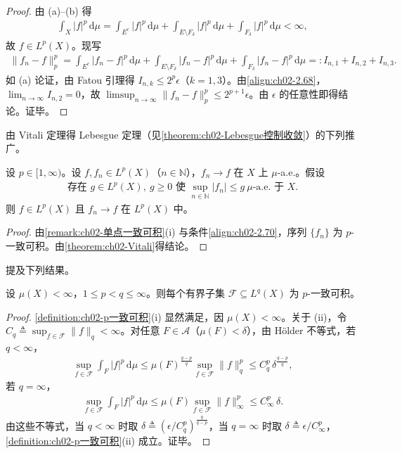 \documentclass[../../main.tex]{subfiles}%
\begin{document}
\begin{proof}
由 (a)--(b) 得
\begin{align*}
\int_X|f|^p\,\mathrm{d}\mu=\int_{E^c}|f|^p\,\mathrm{d}\mu+\int_{E\setminus F_\delta}|f|^p\,\mathrm{d}\mu+\int_{F_\delta}|f|^p\,\mathrm{d}\mu<\infty,
\end{align*}
故 $f\in L^p(X)$。现写
\begin{align}
\|f_n-f\|_p^p=\int_{E^c}|f_n-f|^p\,\mathrm{d}\mu+\int_{E\setminus F_\delta}|f_n-f|^p\,\mathrm{d}\mu+\int_{F_\delta}|f_n-f|^p\,\mathrm{d}\mu
=:I_{n,1}+I_{n,2}+I_{n,3}. \label{align:ch02-2.69}
\end{align}
如 (a) 论证，由 Fatou 引理得 $I_{n,k}\leqslant 2^p\epsilon$（$k=1,3$）。由\eqref{align:ch02-2.68}，$\lim_{n\to\infty}I_{n,2}=0$，故 $\limsup_{n\to\infty}\|f_n-f\|_p^p\leqslant 2^{p+1}\epsilon$。由 $\epsilon$ 的任意性即得结论。证毕。
\end{proof}

由 Vitali 定理得 Lebesgue 定理（见\cref{theorem:ch02-Lebesgue控制收敛}）的下列推广。

\begin{theorem}\label{theorem:ch02-Vitali推广}
设 $p\in[1,\infty)$。设 $f,f_n\in L^p(X)$（$n\in\mathbb N$），$f_n\to f$ 在 $X$ 上 $\mu$-a.e.。假设
\begin{align}
\text{存在 }g\in L^p(X),\ g\geqslant0\text{ 使 }\sup_{n\in\mathbb N}|f_n|\leqslant g\ \mu\text{-a.e. 于 }X. \label{align:ch02-2.70}
\end{align}
则 $f\in L^p(X)$ 且 $f_n\to f$ 在 $L^p(X)$ 中。
\end{theorem}

\begin{proof}
由\cref{remark:ch02-单点一致可积}(i) 与条件\eqref{align:ch02-2.70}，序列 $\{f_n\}$ 为 $p$-一致可积。由\cref{theorem:ch02-Vitali}得结论。
\end{proof}

提及下列结果。

\begin{lemma}\label{lemma:ch02-有界一致可积}
设 $\mu(X)<\infty$，$1\leqslant p<q\leqslant\infty$。则每个有界子集 $\mathscr F\subseteq L^q(X)$ 为 $p$-一致可积。
\end{lemma}

\begin{proof}
\cref{definition:ch02-p一致可积}(i) 显然满足，因 $\mu(X)<\infty$。关于 (ii)，令 $C_q\triangleq \sup_{f\in\mathscr F}\|f\|_q<\infty$。对任意 $F\in\mathscr A$（$\mu(F)<\delta$），由 H\"older 不等式，若 $q<\infty$，
\begin{align*}
\sup_{f\in\mathscr F}\int_F|f|^p\,\mathrm{d}\mu
\leqslant\mu(F)^{\frac{q-p}{q}}\sup_{f\in\mathscr F}\|f\|_q^p
\leqslant C_q^p\,\delta^{\frac{q-p}{q}},
\end{align*}
若 $q=\infty$，
\begin{align*}
\sup_{f\in\mathscr F}\int_F|f|^p\,\mathrm{d}\mu
\leqslant\mu(F)\sup_{f\in\mathscr F}\|f\|_\infty^p
\leqslant C_\infty^p\,\delta.
\end{align*}
由这些不等式，当 $q<\infty$ 时取 $\delta\triangleq \left(\epsilon/C_q^p\right)^{\frac{q}{q-p}}$，当 $q=\infty$ 时取 $\delta\triangleq \epsilon/C_\infty^p$，\cref{definition:ch02-p一致可积}(ii) 成立。证毕。
\end{proof}
\end{document}
